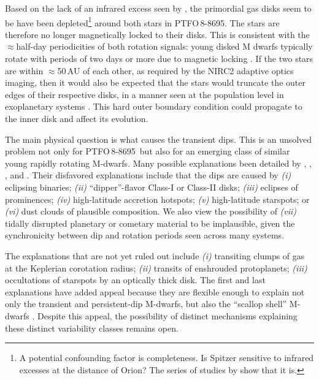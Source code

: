 \documentclass[12pt,twocolumn,tighten]{aastex62}
\newcommand{\ptfo}{PTFO$\,$8-8695}
\begin{document}
Based on the lack of an infrared excess seen by \citet{yu_tests_2015},
the primordial gas disks seem to be have been depleted\footnote{A
potential confounding factor is completeness. Is Spitzer sensitive to
infrared excesses at the distance of Orion? The series of studies by
\cite{hernandez_spitzer_2006,hernandez_spitzer_ob1_2007,hernandez_spitzer_sig_2007,hernandez_spitzer_2009}
show that it is.} around both stars in \ptfo. The stars are therefore
no longer magnetically locked to their disks.  This is consistent with
the $\approx$half-day periodicities of both rotation signals: young
disked M dwarfs typically rotate with periods of two days or more due
to magnetic locking \citep[{\it e.g.},][]{rebull_rotation_2020}.  If
the two stars are within $\approx$50$\,$AU of each other, as required
by the NIRC2 adaptive optics imaging, then it would also be expected
that the stars would truncate the outer edges of their respective
disks, in a manner seen at the population level in exoplanetary
systems \citep{kraus_impact_2016,moe_impact_2019}.  This hard outer
boundary condition could propagate to the inner disk and affect its
evolution.

The main physical question is what causes the
transient dips. This is an unsolved problem not only for \ptfo\ but
also for an emerging class of similar young rapidly rotating M-dwarfs.
Many possible explanations been detailed by \citet{rebull_rotation_2016}, \citet{david_transient_2017},
\citet{stauffer_orbiting_2017}, and \citet{zhan_complex_2019}.
Their disfavored explanations include that the dips are caused by
{\it (i)} eclipsing binaries;
{\it (ii)} ``dipper''-flavor Class-I or Class-II disks;
{\it (iii)} eclipses of prominences;
{\it (iv)} high-latitude accretion hotspots;
{\it (v)} high-latitude starspots;
or
{\it (vi)} dust clouds of plausible composition.
We also view the possibility of {\it (vii)} tidally disrupted planetary
or cometary material to be implausible, given the synchronicity
between dip and rotation periods seen across many systems.

The explanations that are not yet ruled out include
{\it (i)} transiting clumps of gas at the Keplerian corotation radius;
{\it (ii)} transits of enshrouded protoplanets;
{\it (iii)} occultations of starspots by an optically thick disk.
The first and last explanations have added appeal because they are
flexible enough to explain not only the transient and persistent-dip
M-dwarfs, but also the ``scallop shell'' M-dwarfs
\citep{stauffer_orbiting_2017}.
Despite this appeal, the possibility of distinct mechanisms explaining
these distinct variability classes remains open.
\end{document}
